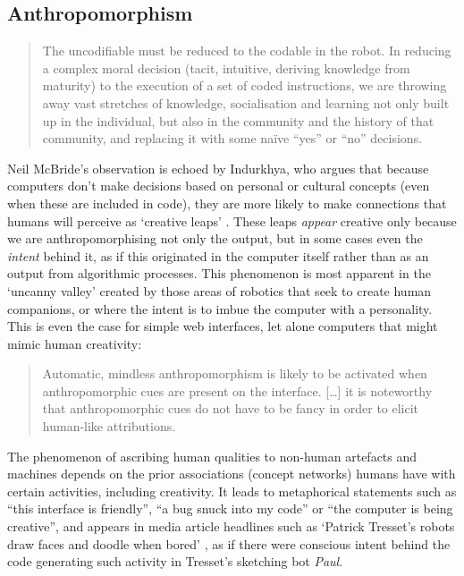 \subsection{Anthropomorphism}
\label{ss:anthropomorphism}

\begin{quotation}
  The uncodifiable must be reduced to the codable in the robot. In reducing a complex moral decision (tacit, intuitive, deriving knowledge from maturity) to the execution of a set of coded instructions, we are throwing away vast stretches of knowledge, socialisation and learning not only built up in the individual, but also in the community and the history of that community, and replacing it with some na{\"i}ve ``yes'' or ``no'' decisions. 
\end{quotation}

Neil McBride's observation is echoed by Indurkhya, who argues that because computers don't make decisions based on personal or cultural concepts (even when these are included in code), they are more likely to make connections that humans will perceive as `creative leaps' \autocite{Indurkhya1997}. These leaps \emph{appear} creative only because we are anthropomorphising not only the output, but in some cases even the \emph{intent} behind it, as if this originated in the computer itself rather than as an output from algorithmic processes. This phenomenon is most apparent in the `uncanny valley' created by those areas of robotics that seek to create human companions, or where the intent is to imbue the computer with a personality. This is even the case for simple web interfaces, let alone computers that might mimic human creativity:

\begin{quotation}
  Automatic, mindless anthropomorphism is likely to be activated when anthropomorphic cues are present on the interface. [\ldots] it is noteworthy that anthropomorphic cues do not have to be fancy in order to elicit human-like attributions. 
\end{quotation}

The phenomenon of ascribing human qualities to non-human artefacts and machines depends on the prior associations (concept networks) humans have with certain activities, including creativity. It leads to metaphorical statements such as ``this interface is friendly'', ``a bug snuck into my code'' or ``the computer is being creative'', and appears in media article headlines such as `Patrick Tresset\rq s robots draw faces and doodle when bored' \autocite{Wired2011}, as if there were conscious intent behind the code generating such activity in Tresset's sketching bot \textit{Paul}.

